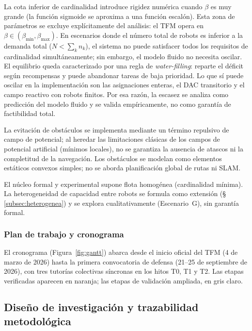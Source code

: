 La cota inferior de cardinalidad introduce rigidez numérica cuando $\beta$ es
muy grande (la función sigmoide se aproxima a una función escalón). Esta zona
de parámetros se excluye explícitamente del análisis: el TFM opera en
$\beta \in (\beta_{\min}, \beta_{\max})$. En escenarios donde el número total de
robots es inferior a la demanda total ($N < \sum_k n_k$), el sistema no puede
satisfacer todos los requisitos de cardinalidad simultáneamente; sin embargo, el
modelo fluido no necesita oscilar. El equilibrio queda caracterizado por una regla de
\emph{water-filling}: reparte el déficit según recompensas y puede abandonar tareas de
baja prioridad. Lo que sí puede oscilar en la implementación son las asignaciones
enteras, el DAC transitorio y el campo reactivo con robots finitos. Por esa razón, la
escasez se analiza como predicción del modelo fluido y se valida empíricamente, no como
garantía de factibilidad total.

La evitación de obstáculos se implementa mediante un término repulsivo de campo de
potencial; al heredar las limitaciones clásicas de los campos de potencial artificial
(mínimos locales), no se garantiza la ausencia de atascos ni la completitud de la
navegación. Los obstáculos se modelan como elementos estáticos convexos simples; no se
aborda planificación global de rutas ni SLAM.

El núcleo formal y experimental supone flota homogénea (cardinalidad mínima). La
heterogeneidad de capacidad entre robots se formula como extensión
(\S\,\ref{subsec:heterogenea}) y se explora cualitativamente (Escenario~G), sin
garantía formal.

\subsubsection{Plan de trabajo y cronograma}
\label{sec:cronograma}

El cronograma (Figura~\ref{fig:gantt}) abarca desde el inicio oficial del TFM
(4 de marzo de 2026) hasta la primera convocatoria de defensa (21--25 de
septiembre de 2026), con tres tutorías colectivas síncronas en los hitos T0,
T1 y T2. Las etapas verificadas aparecen en naranja; las etapas de validación ampliada,
en gris claro.





\subsection{Diseño de investigación y trazabilidad metodológica}
\label{subsec:diseno_investigacion}

